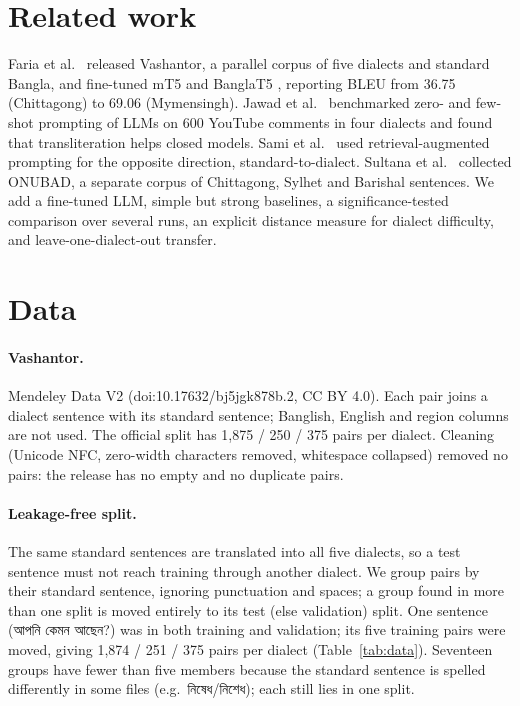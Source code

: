 \documentclass[10pt,twocolumn]{article}
\newcommand{\bn}[1]{\textbengali{#1}}
\begin{document}
\section{Related work}
Faria et al.\ \cite{vashantor} released Vashantor, a parallel corpus of five dialects and standard Bangla,
and fine-tuned mT5 and BanglaT5 \cite{banglat5}, reporting BLEU from 36.75 (Chittagong) to 69.06
(Mymensingh). Jawad et al.\ \cite{jawad} benchmarked zero- and few-shot prompting of LLMs on 600 YouTube
comments in four dialects and found that transliteration helps closed models. Sami et al.\ \cite{sami} used
retrieval-augmented prompting for the opposite direction, standard-to-dialect. Sultana et al.\ \cite{onubad}
collected ONUBAD, a separate corpus of Chittagong, Sylhet and Barishal sentences. We add a fine-tuned LLM,
simple but strong baselines, a significance-tested comparison over several runs, an explicit distance measure
for dialect difficulty, and leave-one-dialect-out transfer.

\section{Data}
\paragraph{Vashantor.} Mendeley Data V2 (doi:10.17632/bj5jgk878b.2, CC BY 4.0). Each pair joins a dialect
sentence with its standard sentence; Banglish, English and region columns are not used. The official split
has 1,875 / 250 / 375 pairs per dialect. Cleaning (Unicode NFC, zero-width characters removed, whitespace
collapsed) removed no pairs: the release has no empty and no duplicate pairs.

\paragraph{Leakage-free split.} The same standard sentences are translated into all five dialects, so a test
sentence must not reach training through another dialect. We group pairs by their standard sentence,
ignoring punctuation and spaces; a group found in more than one split is moved entirely to its test (else
validation) split. One sentence (\bn{আপনি কেমন আছেন?}) was in both training and validation; its five
training pairs were moved, giving 1,874 / 251 / 375 pairs per dialect (Table~\ref{tab:data}).
Seventeen groups have fewer than five members because the standard sentence is spelled differently in some
files (e.g.\ \bn{নিষেধ}/\bn{নিশেধ}); each still lies in one split.
\end{document}
